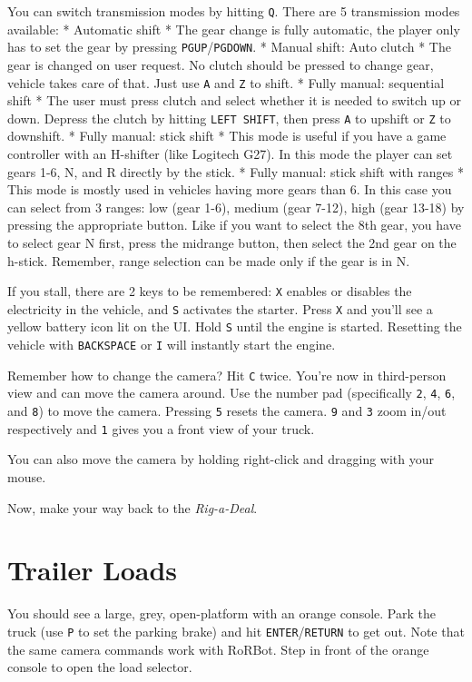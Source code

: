 You can switch transmission modes by hitting \texttt{Q}. There are 5
transmission modes available: * Automatic shift * The gear change is
fully automatic, the player only has to set the gear by pressing
\texttt{PGUP}/\texttt{PGDOWN}. * Manual shift: Auto clutch * The gear is
changed on user request. No clutch should be pressed to change gear,
vehicle takes care of that. Just use \texttt{A} and \texttt{Z} to shift.
* Fully manual: sequential shift * The user must press clutch and select
whether it is needed to switch up or down. Depress the clutch by hitting
\texttt{LEFT\ SHIFT}, then press \texttt{A} to upshift or \texttt{Z} to
downshift. * Fully manual: stick shift * This mode is useful if you have
a game controller with an H-shifter (like Logitech G27). In this mode
the player can set gears 1-6, N, and R directly by the stick. * Fully
manual: stick shift with ranges * This mode is mostly used in vehicles
having more gears than 6. In this case you can select from 3 ranges: low
(gear 1-6), medium (gear 7-12), high (gear 13-18) by pressing the
appropriate button. Like if you want to select the 8th gear, you have to
select gear N first, press the midrange button, then select the 2nd gear
on the h-stick. Remember, range selection can be made only if the gear
is in N.

If you stall, there are 2 keys to be remembered: \texttt{X} enables or
disables the electricity in the vehicle, and \texttt{S} activates the
starter. Press \texttt{X} and you'll see a yellow battery icon lit on
the UI. Hold \texttt{S} until the engine is started. Resetting the
vehicle with \texttt{BACKSPACE} or \texttt{I} will instantly start the
engine.

Remember how to change the camera? Hit \texttt{C} twice. You're now in
third-person view and can move the camera around. Use the number pad
(specifically \texttt{2}, \texttt{4}, \texttt{6}, and \texttt{8}) to
move the camera. Pressing \texttt{5} resets the camera. \texttt{9} and
\texttt{3} zoom in/out respectively and \texttt{1} gives you a front
view of your truck.

You can also move the camera by holding right-click and dragging with
your mouse.

Now, make your way back to the \emph{Rig-a-Deal}.

\hypertarget{trailer-loads}{%
\section{Trailer Loads}\label{trailer-loads}}
You should see a large, grey, open-platform with an orange console. Park
the truck (use \texttt{P} to set the parking brake) and hit
\texttt{ENTER}/\texttt{RETURN} to get out. Note that the same camera
commands work with RoRBot. Step in front of the orange console to open
the load selector.

